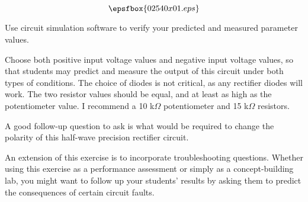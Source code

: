

$$\epsfbox{02540x01.eps}$$

\vfil \eject






Use circuit simulation software to verify your predicted and measured parameter values.







Choose both positive input voltage values and negative input voltage values, so that students may predict and measure the output of this circuit under both types of conditions.  The choice of diodes is not critical, as any rectifier diodes will work.  The two resistor values should be equal, and at least as high as the potentiometer value.  I recommend a 10 k$\Omega$ potentiometer and 15 k$\Omega$ resistors.

A good follow-up question to ask is what would be required to change the polarity of this half-wave precision rectifier circuit.

An extension of this exercise is to incorporate troubleshooting questions.  Whether using this exercise as a performance assessment or simply as a concept-building lab, you might want to follow up your students' results by asking them to predict the consequences of certain circuit faults.




